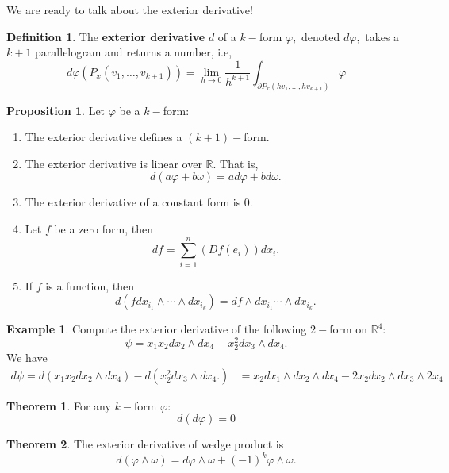 \documentclass[10pt, oneside]{article}
\newcommand{\bbR}{\mathbb{R}}
\theoremstyle{definition}
\newtheorem{exmp}{Example}[section]
\newtheorem{thm}{Theorem}
\newtheorem{defn}{Definition}
\newtheorem{prop}{Proposition}
\begin{document}
We are ready to talk about the exterior derivative!
\begin{defn}
    The \textbf{exterior derivative} $d$ of a $k-$form $\varphi,$ denoted $d\varphi,$ takes a $k+1$ parallelogram and returns a number, i.e,
    \[d\varphi(P_x(v_1, \dots, v_{k+1})) = \lim_{h\to 0}\frac{1}{h^{k+1}}\int_{\partial P_x(hv_1, \dots, hv_{k+1})} \varphi\]
\end{defn}
\begin{prop}
Let $\varphi$ be a $k-$form:
\begin{enumerate}
    \item The exterior derivative defines a $(k+1)-$form. 
    \item The exterior derivative is linear over $\bbR.$ That is,
    \[d(a \varphi + b\omega) = ad\varphi + bd\omega.\]
    \item The exterior derivative of a constant form is $0.$
    \item Let $f$ be a zero form, then
    \[df = \sum_{i=1}^n (Df(e_i))dx_i.\]
    \item If $f$ is a function, then
    \[d(fdx_{i_1}\wedge \cdots \wedge dx_{i_k}) = df \wedge dx_{i_1}\cdots \wedge dx_{i_k}.\]
\end{enumerate}
\end{prop}
\begin{exmp}
    Compute the exterior derivative of the following $2-$form on $\bbR^4:$
    \[\psi = x_1x_2 dx_2 \wedge dx_4 - x_2^2 dx_3 \wedge dx_4.\] We have 
    \begin{align*}
        d\psi = d(x_1x_2 dx_2 \wedge dx_4) - d(x_2^2 dx_3 \wedge dx_4.)
        &= x_2 dx_1 \wedge dx_2 \wedge dx_4 - 2x_2 dx_2 \wedge dx_3 \wedge 2x_4
    \end{align*}
\end{exmp}

\begin{thm}
    For any $k-$form $\varphi:$
    \[d(d\varphi) = 0\]
\end{thm}

\begin{thm}
    The exterior derivative of wedge product is
    \[d(\varphi \wedge \omega) = d\varphi \wedge \omega + (-1)^k \varphi \wedge \omega.\]
\end{thm}
    
\end{document}
